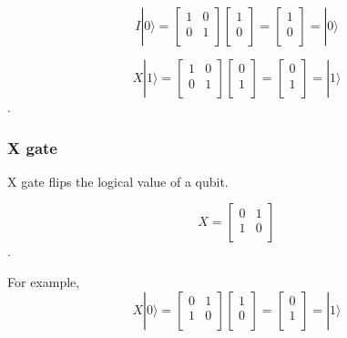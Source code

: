 \begin{equation}
 I|0\rangle = \begin{bmatrix}
1 & 0 \\
0 & 1 \\
\end{bmatrix} 
\left[
\begin{array}{c}
1 \\
0 \\
\end{array}
\right]
= \left[
\begin{array}{c}
1 \\
0 \\
\end{array}
\right]
= |0\rangle
\end{equation}

\begin{equation}
X|1\rangle = \begin{bmatrix}
1 & 0 \\
0 & 1 \\
\end{bmatrix} 
\left[
\begin{array}{c}
0 \\
1  \\
\end{array}
\right]
= \left[
\begin{array}{c}
0 \\
1 \\
\end{array}
\right]
= |1\rangle
\end{equation}.


\subsubsection{X gate}

X gate flips the logical value of a qubit.

\begin{equation}
X = \begin{bmatrix}
0 & 1 \\
1 & 0 \\
\end{bmatrix}
\end{equation}.

For example,
\begin{equation}
X|0\rangle = \begin{bmatrix}
0 & 1 \\
1 & 0 \\
\end{bmatrix} 
\left[
\begin{array}{c}
1 \\
0 \\
\end{array}
\right]
= \left[
\begin{array}{c}
0 \\
1 \\
\end{array}
\right]
= |1\rangle
\end{equation}

